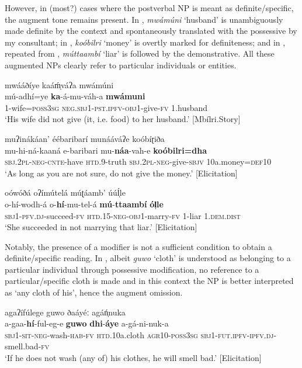 \documentclass[output=paper,colorlinks=true, citecolor=brown,draftmode]{langscibook}
\begin{document}
However, in (most?) cases where the postverbal NP is meant as definite/specific, the augment tone remains present. In , \textit{mwámúni} ‘husband’ is unambiguously made definite by the context and spontaneously translated with the possessive by my consultant; in , \textit{koóbilri} ‘money’ is overtly marked for definiteness; and in , repeated from , \textit{múttaambí} ‘liar’ is followed by the demonstrative. All these augmented NPs clearly refer to particular individuals or entities.

{\ea\label{ex:cuw:74} mwááðíye kaáḿ̩váʔa mwámúni\\
    \gll mú-adhí=ye \textbf{ka}{}-á-mu-váh-a \textbf{mwámuni}  \\
         1-wife=\textsc{poss3sg} \textsc{neg.sbj1}-\textsc{pst.ipfv-obj}1-give-\textsc{fv} 1.husband  \\
    \glt ‘His wife did not give (it, i.e. food) to her husband.’ [Mbílri.Story]
\z }

\ea\label{ex:cuw:75} muʔinákáan’ éébaribarí munááváʔe koóbíɽiða  \\
    \gll  mu-hi-ná-kaaná e-baribari mu-\textbf{náa}{}-vah-e \textbf{koóbilri=dha}\\
           \textsc{sbj.2pl-neg-cnte}{}-have \textsc{htd}.9-truth \textsc{sbj.2pl-neg}{}-give-\textsc{sbjv} 10a.money=\textsc{def10}\\
    \glt  ‘As long as you are not sure, do not give the money.’ [Elicitation]
\z 

\ea\label{ex:cuw:76} oówóðá oʔímútelá múʈáamb’ úúĺ̩le \\ 
    \gll o-hí-wodh-á o-\textbf{hí}{}-mu-tel-á \textbf{mú}{}-\textbf{ttaambí} \textbf{ól̩le}\\
          \textsc{sbj1-pfv.dj}{}-succeed-\textsc{fv} \textsc{htd.15-neg}{}-\textsc{obj}1-marry-\textsc{fv} 1-liar 1.\textsc{dem.dist} \\
    \glt ‘She succeeded in not marrying that liar.’ [Elicitation]
\z 


Notably, the presence of a modifier is not a sufficient condition to obtain a definite/specific reading. In , albeit \textit{guwo} ‘cloth’ is understood as belonging to a particular individual through possessive modification, no reference to a particular/specific cloth is made and in this context the NP is better interpreted as ‘any cloth of his’, hence the augment omission. 

\ea\label{ex:cuw:77} agaʔífúlege guwo ðaáyéː agáń̩nuka \\ 
    \gll  a-gaa-\textbf{hí}{}-ful-eg-e \textbf{guwo} \textbf{dhi}{}-\textbf{áye} a-gá-ni-nuk-a \\
          \textsc{sbj1}{}-\textsc{sit}{}-\textsc{neg}{}-wash{}-\textsc{hab}{}-\textsc{fv} \textsc{htd}.10a.cloth \textsc{agr}10-\textsc{poss3sg} \textsc{sbj1}{}-\textsc{fut.ipfv}{}-\textsc{ipfv.dj}{}-smell.bad-\textsc{fv}\\
    \glt ‘If he does not wash (any of) his clothes, he will smell bad.’ [Elicitation]
\z 
\end{document}

